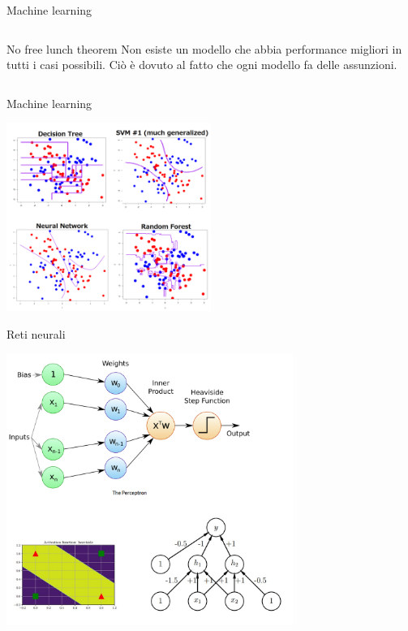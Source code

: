 \documentclass[11pt]{beamer}
\begin{document}
\begin{frame}{Machine learning \cite{pml1Book,pml2Book,classification,regression}}
\begin{columns}
\begin{column}{0.4\textwidth}
\begin{center}
\end{center}
\begin{alertblock}{No free lunch theorem}
Non esiste un modello che abbia performance migliori in tutti i casi possibili. Ciò è dovuto al fatto che ogni modello fa delle assunzioni.
\end{alertblock}
\end{column}
\end{columns}
\end{frame}


\begin{frame}{Machine learning \cite{pml1Book,pml2Book,classification,regression}}

\begin{center}
\includegraphics[width=0.5\textwidth]{Pic/ML_dec_boundary.png}
\end{center}


\end{frame}




\begin{frame}{Reti neurali \cite{pml1Book,pml2Book}}
\begin{center}
\includegraphics[width=0.7\textwidth]{Pic/perceptron.png}
\end{center}
\end{frame}
\end{document}
